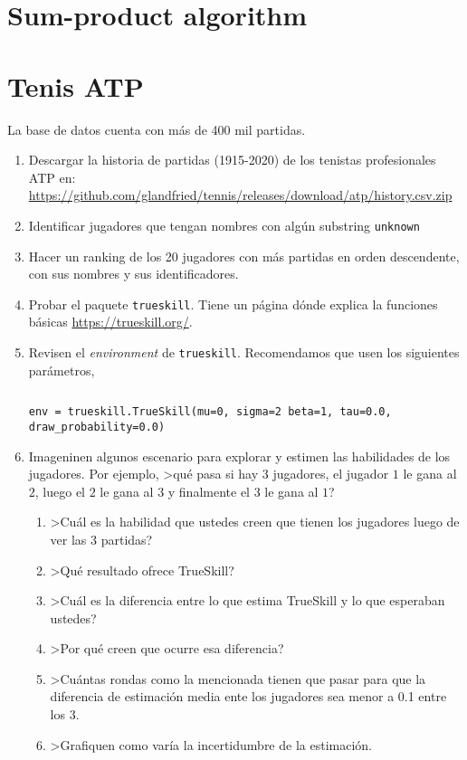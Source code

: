 \documentclass[a4paper,10pt]{article}
\begin{document}
\section{Sum-product algorithm}


\section{Tenis ATP} 

La base de datos cuenta con más de 400 mil partidas.

\begin{enumerate}
 \item Descargar la historia de partidas (1915-2020) de los tenistas profesionales ATP en: \url{https://github.com/glandfried/tennis/releases/download/atp/history.csv.zip}
 \item Identificar jugadores que tengan nombres con algún substring \texttt{unknown}
 \item Hacer un ranking de los 20 jugadores con más partidas en orden descendente, con sus nombres y sus identificadores.
 \item Probar el paquete \texttt{trueskill}. Tiene un página dónde explica la funciones básicas \url{https://trueskill.org/}.
 \item Revisen el \emph{environment} de \texttt{trueskill}.
    Recomendamos que usen los siguientes parámetros,

    \begin{lstlisting}[backgroundcolor=\color{white},label=lst:env, caption=\relax, belowskip=-1.0 \baselineskip, aboveskip=-0 \baselineskip]
    \end{lstlisting}
    \begin{lstlisting}[backgroundcolor=\color{all}]
    env = trueskill.TrueSkill(mu=0, sigma=2 beta=1, tau=0.0, draw_probability=0.0)
    \end{lstlisting}  
 \item Imageninen algunos escenario para explorar y estimen las habilidades de los jugadores. Por ejemplo, >qué pasa si hay 3 jugadores, el jugador $1$ le gana al $2$, luego el $2$ le gana al $3$ y finalmente el $3$ le gana al $1$?
    \begin{enumerate}
    \item >Cuál es la habilidad que ustedes creen que tienen los jugadores luego de ver las 3 partidas?
    \item >Qué resultado ofrece TrueSkill?
    \item >Cuál es la diferencia entre lo que estima TrueSkill y lo que esperaban ustedes?
    \item >Por qué creen que ocurre esa diferencia?
    \item >Cuántas rondas como la mencionada tienen que pasar para que la diferencia de estimación media ente los jugadores sea menor a 0.1 entre los 3.
    \item >Grafiquen como varía la incertidumbre de la estimación.
    \end{enumerate}
\end{enumerate}
\end{document}
